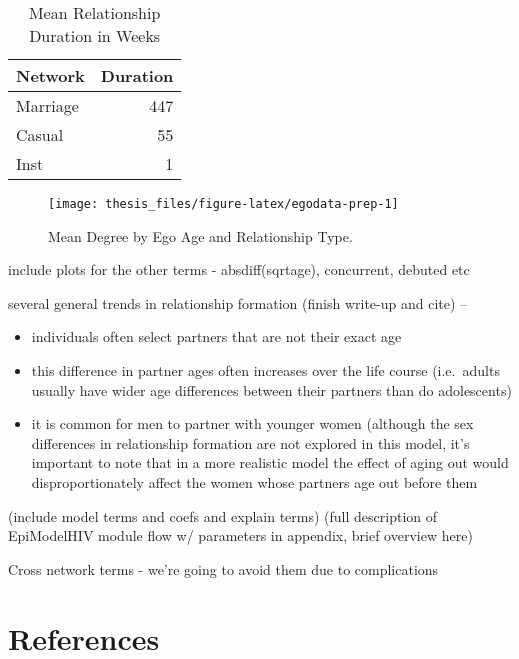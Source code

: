 \documentclass [11pt, proquest] {uwthesis}[2015/03/03]
\providecommand{\tightlist}{%
  \setlength{\itemsep}{0pt}\setlength{\parskip}{0pt}}
\begin{document}
\begin{table}

\caption{\label{tab:coefs}Mean Relationship Duration in Weeks}
\centering
\begin{tabular}[t]{lr}
\toprule
Network & Duration\\
\midrule
Marriage & 447\\
Casual & 55\\
Inst & 1\\
\bottomrule
\end{tabular}
\end{table}
\begin{figure}

{\centering \texttt{[image: thesis\_files/figure-latex/egodata-prep-1]} 

}

\caption{Mean Degree by Ego Age and Relationship Type.}\label{fig:egodata-prep}
\end{figure}
include plots for the other terms - absdiff(sqrtage), concurrent, debuted etc

several general trends in relationship formation (finish write-up and cite) --
\begin{itemize}
\tightlist
\item
  individuals often select partners that are not their exact age
\item
  this difference in partner ages often increases over the life course (i.e.~adults usually have wider age differences between their partners than do adolescents)
\item
  it is common for men to partner with younger women (although the sex differences in relationship formation are not explored in this model, it's important to note that in a more realistic model the effect of aging out would disproportionately affect the women whose partners age out before them
\end{itemize}
(include model terms and coefs and explain terms)
(full description of EpiModelHIV module flow w/ parameters in appendix, brief overview here)

Cross network terms - we're going to avoid them due to complications

\backmatter

\hypertarget{references}{%
\chapter*{References}\label{references}}
\end{document}
